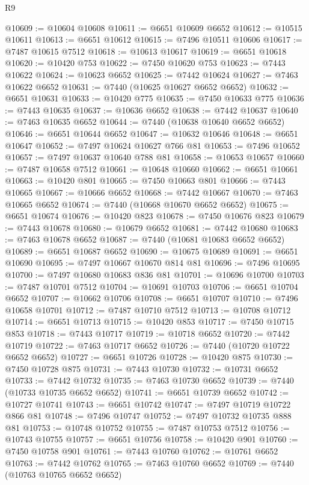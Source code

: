 \begin{lexlean}{R9}
\begin{coremodule}
@10609 := @10604 @10608
@10611 := @6651 @10609 @6652
@10612 := @10515 @10611
@10613 := @6651 @10612
@10615 := @7496 @10511 @10606
@10617 := @7487 @10615 @7512
@10618 := @10613 @10617
@10619 := @6651 @10618
@10620 := @10420 @753
@10622 := @7450 @10620 @753
@10623 := @7443 @10622
@10624 := @10623 @6652
@10625 := @7442 @10624
@10627 := @7463 @10622 @6652
@10631 := @7440 (@10625 @10627 @6652 @6652)
@10632 := @6651 @10631
@10633 := @10420 @775
@10635 := @7450 @10633 @775
@10636 := @7443 @10635
@10637 := @10636 @6652
@10638 := @7442 @10637
@10640 := @7463 @10635 @6652
@10644 := @7440 (@10638 @10640 @6652 @6652)
@10646 := @6651 @10644 @6652
@10647 := @10632 @10646
@10648 := @6651 @10647
@10652 := @7497 @10624 @10627 @766 @81
@10653 := @7496 @10652
@10657 := @7497 @10637 @10640 @788 @81
@10658 := @10653 @10657
@10660 := @7487 @10658 @7512
@10661 := @10648 @10660
@10662 := @6651 @10661
@10663 := @10420 @801
@10665 := @7450 @10663 @801
@10666 := @7443 @10665
@10667 := @10666 @6652
@10668 := @7442 @10667
@10670 := @7463 @10665 @6652
@10674 := @7440 (@10668 @10670 @6652 @6652)
@10675 := @6651 @10674
@10676 := @10420 @823
@10678 := @7450 @10676 @823
@10679 := @7443 @10678
@10680 := @10679 @6652
@10681 := @7442 @10680
@10683 := @7463 @10678 @6652
@10687 := @7440 (@10681 @10683 @6652 @6652)
@10689 := @6651 @10687 @6652
@10690 := @10675 @10689
@10691 := @6651 @10690
@10695 := @7497 @10667 @10670 @814 @81
@10696 := @7496 @10695
@10700 := @7497 @10680 @10683 @836 @81
@10701 := @10696 @10700
@10703 := @7487 @10701 @7512
@10704 := @10691 @10703
@10706 := @6651 @10704 @6652
@10707 := @10662 @10706
@10708 := @6651 @10707
@10710 := @7496 @10658 @10701
@10712 := @7487 @10710 @7512
@10713 := @10708 @10712
@10714 := @6651 @10713
@10715 := @10420 @853
@10717 := @7450 @10715 @853
@10718 := @7443 @10717
@10719 := @10718 @6652
@10720 := @7442 @10719
@10722 := @7463 @10717 @6652
@10726 := @7440 (@10720 @10722 @6652 @6652)
@10727 := @6651 @10726
@10728 := @10420 @875
@10730 := @7450 @10728 @875
@10731 := @7443 @10730
@10732 := @10731 @6652
@10733 := @7442 @10732
@10735 := @7463 @10730 @6652
@10739 := @7440 (@10733 @10735 @6652 @6652)
@10741 := @6651 @10739 @6652
@10742 := @10727 @10741
@10743 := @6651 @10742
@10747 := @7497 @10719 @10722 @866 @81
@10748 := @7496 @10747
@10752 := @7497 @10732 @10735 @888 @81
@10753 := @10748 @10752
@10755 := @7487 @10753 @7512
@10756 := @10743 @10755
@10757 := @6651 @10756
@10758 := @10420 @901
@10760 := @7450 @10758 @901
@10761 := @7443 @10760
@10762 := @10761 @6652
@10763 := @7442 @10762
@10765 := @7463 @10760 @6652
@10769 := @7440 (@10763 @10765 @6652 @6652)

\end{coremodule}
\end{lexlean}
